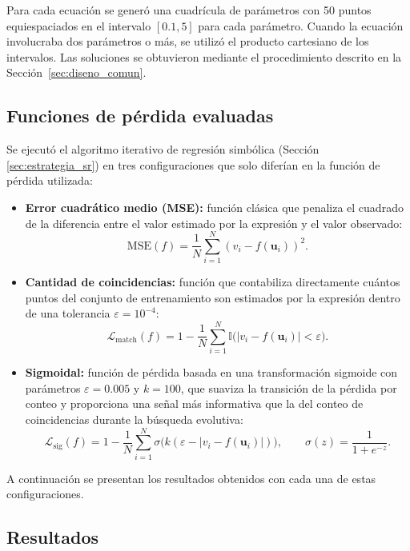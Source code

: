 Para cada ecuación se generó una cuadrícula de parámetros con 50 puntos equiespaciados en el intervalo $[0.1, 5]$ para cada parámetro. Cuando la ecuación involucraba dos parámetros o más, se utilizó el producto cartesiano de los intervalos. Las soluciones se obtuvieron mediante el procedimiento descrito en la Sección~\ref{sec:diseno_comun}.

\subsection{Funciones de pérdida evaluadas}

Se ejecutó el algoritmo iterativo de regresión simbólica (Sección \ref{sec:estrategia_sr}) en tres configuraciones que solo diferían en la función de pérdida utilizada:

\begin{itemize} \item \textbf{Error cuadrático medio (MSE):} función clásica que penaliza el cuadrado de la diferencia entre el valor estimado por la expresión y el valor observado: \[ \text{MSE}(f) = \frac{1}{N} \sum_{i=1}^{N} \left( v_i - f(\mathbf{u}_i) \right)^2 . \]

	\item \textbf{Cantidad de coincidencias:} función que contabiliza directamente cuántos puntos del conjunto de entrenamiento son estimados por la expresión dentro de una tolerancia $\varepsilon = 10^{-4}$: \[ \mathcal{L}_{\text{match}}(f) = 1 - \frac{1}{N} \sum_{i=1}^{N} \mathbb{I}\bigl( |v_i - f(\mathbf{u}_i)| < \varepsilon \bigr). \]

	\item \textbf{Sigmoidal:} función de pérdida basada en una transformación sigmoide con parámetros $\varepsilon = 0.005$ y $k = 100$, que suaviza la transición de la pérdida por conteo y proporciona una señal más informativa que la del conteo de coincidencias durante la búsqueda evolutiva: \[ \mathcal{L}_{\text{sig}}(f) = 1 - \frac{1}{N} \sum_{i=1}^{N} \sigma\bigl( k (\varepsilon - |v_i - f(\mathbf{u}_i)|) \bigr), \qquad \sigma(z) = \frac{1}{1 + e^{-z}} . \] \end{itemize}

A continuación se presentan los resultados obtenidos con cada una de estas configuraciones.

\subsection{Resultados}


